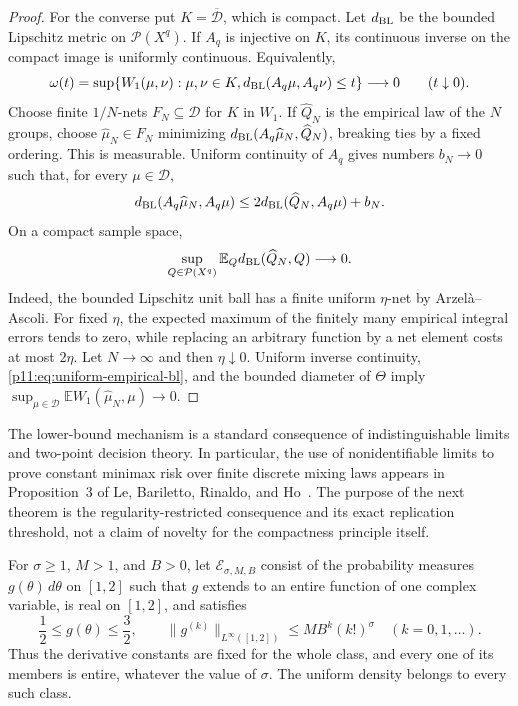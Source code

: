 \documentclass[11pt,letterpaper]{article}
\theoremstyle{definition}
\theoremstyle{remark}
\newcommand{\1}{\mathbf 1}
\begin{document}
\begin{proof}
For the converse put $K=\overline{\mathcal D}$, which is compact.
Let $d_{\rm BL}$ be the bounded Lipschitz metric on
$\mathcal P(X^q)$.  If $A_q$ is injective on $K$, its continuous
inverse on the compact image is uniformly continuous.  Equivalently,
\[
 \omega(t)=\sup\{W_1(\mu,\nu):\mu,\nu\in K,
                   d_{\rm BL}(A_q\mu,A_q\nu)\leq t\}
 \longrightarrow0\qquad(t\downarrow0).
\]
Choose finite $1/N$-nets $F_N\subseteq\mathcal D$ for $K$ in $W_1$.
If $\widehat Q_N$ is the empirical law of the $N$ groups, choose
$\widehat\mu_N\in F_N$ minimizing
$d_{\rm BL}(A_q\widehat\mu_N,\widehat Q_N)$, breaking ties by a fixed
ordering.  This is measurable.  Uniform continuity of $A_q$ gives
numbers $b_N\to0$ such that, for every $\mu\in\mathcal D$,
\[
 d_{\rm BL}(A_q\widehat\mu_N,A_q\mu)
 \leq 2d_{\rm BL}(\widehat Q_N,A_q\mu)+b_N.
\]
On a compact sample space,
\begin{equation}\label{p11:eq:uniform-empirical-bl}
 \sup_{Q\in\mathcal P(X^q)}
       \mathbb E_Q d_{\rm BL}(\widehat Q_N,Q)\longrightarrow0.
\end{equation}
Indeed, the bounded Lipschitz unit ball has a finite uniform
$\eta$-net by Arzel\`a--Ascoli.  For fixed $\eta$, the expected maximum
of the finitely many empirical integral errors tends to zero, while
replacing an arbitrary function by a net element costs at most
$2\eta$.  Let $N\to\infty$ and then $\eta\downarrow0$.
Uniform inverse continuity, \eqref{p11:eq:uniform-empirical-bl}, and the
bounded diameter of $\Theta$ imply
$\sup_{\mu\in\mathcal D}\mathbb E W_1(\widehat\mu_N,\mu)\to0$.
\end{proof}

The lower-bound mechanism is a standard consequence of indistinguishable
limits and two-point decision theory.  In particular, the use of
nonidentifiable limits to prove constant minimax risk over finite
discrete mixing laws appears in Proposition~3 of
Le, Bariletto, Rinaldo, and Ho~\cite{LeBarilettoRinaldoHo2026}.  The purpose of the next theorem is the
regularity-restricted consequence and its exact replication threshold,
not a claim of novelty for the compactness principle itself.

For $\sigma\geq1$, $M>1$, and $B>0$, let
$\mathcal E_{\sigma,M,B}$ consist of the probability measures
$g(\theta)\,d\theta$ on $[1,2]$ such that $g$ extends to an entire
function of one complex variable, is real on $[1,2]$, and satisfies
\begin{equation}\label{p11:eq:entire-gevrey-ball}
 \frac12\leq g(\theta)\leq\frac32,\qquad
 \|g^{(k)}\|_{L^\infty([1,2])}
        \leq MB^k(k!)^\sigma\quad(k=0,1,\ldots).
\end{equation}
Thus the derivative constants are fixed for the whole class, and
every one of its members is entire, whatever the value of $\sigma$.
The uniform density belongs to every such class.
\end{document}
